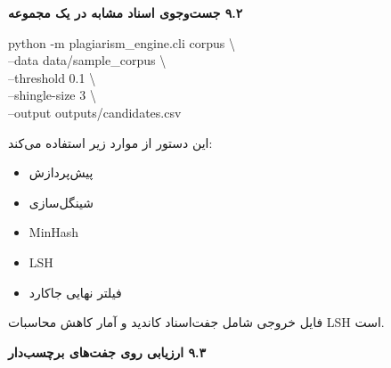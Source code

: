 \documentclass[11pt]{article}
\begin{document}
\medskip\noindent\hrulefill\medskip

\smallskip
{\bfseries ‏۹.۲ جست‌وجوی اسناد مشابه در یک مجموعه}\smallskip


{\mycode
\begin{flushleft}
python -m plagiarism\_engine.cli corpus \textbackslash{} \\
\hspace*{1.10em}--data data/sample\_corpus \textbackslash{} \\
\hspace*{1.10em}--threshold 0.1 \textbackslash{} \\
\hspace*{1.10em}--shingle-size 3 \textbackslash{} \\
\hspace*{1.10em}--output outputs/candidates.csv
\end{flushleft}}

\noindent ‏این دستور از موارد زیر استفاده می‌کند:\par

\begin{itemize}

\item ‏پیش‌پردازش

\item ‏شینگل‌سازی

\item ‏MinHash

\item ‏LSH

\item ‏فیلتر نهایی جاکارد

\end{itemize}

\noindent ‏فایل خروجی شامل جفت‌اسناد کاندید و آمار کاهش محاسبات LSH است.\par

\medskip\noindent\hrulefill\medskip

\smallskip
{\bfseries ‏۹.۳ ارزیابی روی جفت‌های برچسب‌دار}\smallskip
\end{document}
